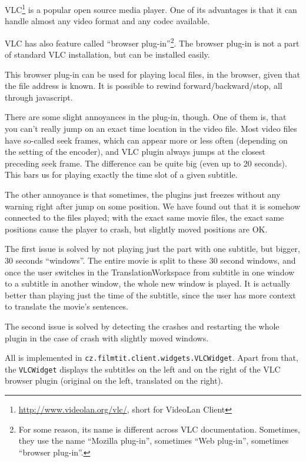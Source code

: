 VLC\footnote{\url{http://www.videolan.org/vlc/}, short for VideoLan Client} is a popular open source media player. One of its advantages is that it can handle almost any video format and any codec available.

VLC has also feature called ``browser plug-in''\footnote{For some reason, its name is different across VLC documentation. Sometimes, they use the name ``Mozilla plug-in'', sometimes ``Web plug-in'', sometimes ``browser plug-in''.}. The browser plug-in is not a part of standard VLC installation, but can be installed easily.

This browser plug-in can be used for playing local files, in the browser, given that the file address is known. It is possible to rewind forward/backward/stop, all through javascript.

There are some slight annoyances in the plug-in, though. One of them is, that you can't really jump on an exact time location in the video file. Most video files have so-called seek frames, which can appear more or less often (depending on the setting of the encoder), and VLC plugin always jumps at the closest preceding seek frame. The difference can be quite big (even up to 20 seconds). This bars us for playing exactly the time slot of a given subtitle.

The other annoyance is that sometimes, the plugins just freezes without any warning right after jump on some position. We have found out that it is somehow connected to the files played; with the exact same movie files, the exact same positions cause the player to crash, but slightly moved positions are OK.

The first issue is solved by not playing just the part with one subtitle, but bigger, 30 seconds ``windows''. The entire movie is split to these 30 second windows, and once the user switches in the TranslationWorkspace from subtitle in one window to a subtitle in another window, the whole new window is played. It is actually better than playing just the time of the subtitle, since the user has more context to translate the movie's sentences.

The second issue is solved by detecting the crashes and restarting the whole plugin in the case of crash with slightly moved windows.

All is implemented in \texttt{cz.filmtit.client.widgets.VLCWidget}. Apart from that, the \texttt{VLCWidget} displays the subtitles on the left and on the right of the VLC browser plugin (original on the left, translated on the right).


